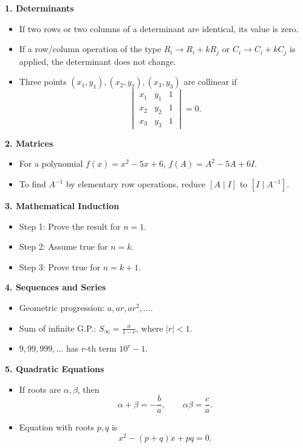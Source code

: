\documentclass[11pt,a4paper]{article}
\begin{document}
\begin{tcolorbox}[breakable,colback=lightgray,colframe=titleblue,title=Key Theory Required for This Paper]
\textbf{1. Determinants}
\begin{itemize}[leftmargin=1.2em]
\item If two rows or two columns of a determinant are identical, its value is zero.
\item If a row/column operation of the type \(R_i\to R_i+kR_j\) or \(C_i\to C_i+kC_j\) is applied, the determinant does not change.
\item Three points \((x_1,y_1),(x_2,y_2),(x_3,y_3)\) are collinear if
\[
\begin{vmatrix}x_1&y_1&1\\x_2&y_2&1\\x_3&y_3&1\end{vmatrix}=0.
\]
\end{itemize}

\textbf{2. Matrices}
\begin{itemize}[leftmargin=1.2em]
\item For a polynomial \(f(x)=x^2-5x+6\), \(f(A)=A^2-5A+6I\).
\item To find \(A^{-1}\) by elementary row operations, reduce \([A\mid I]\) to \([I\mid A^{-1}]\).
\end{itemize}

\textbf{3. Mathematical Induction}
\begin{itemize}[leftmargin=1.2em]
\item Step 1: Prove the result for \(n=1\).
\item Step 2: Assume true for \(n=k\).
\item Step 3: Prove true for \(n=k+1\).
\end{itemize}

\textbf{4. Sequences and Series}
\begin{itemize}[leftmargin=1.2em]
\item Geometric progression: \(a,ar,ar^2,\ldots\).
\item Sum of infinite G.P.: \(S_\infty=\frac{a}{1-r}\), where \(|r|<1\).
\item \(9,99,999,\ldots\) has \(r\)-th term \(10^r-1\).
\end{itemize}

\textbf{5. Quadratic Equations}
\begin{itemize}[leftmargin=1.2em]
\item If roots are \(\alpha,\beta\), then
\[
\alpha+\beta=-\frac{b}{a},\qquad \alpha\beta=\frac{c}{a}.
\]
\item Equation with roots \(p,q\) is
\[
x^2-(p+q)x+pq=0.
\]
\end{itemize}


\end{tcolorbox}
\end{document}
